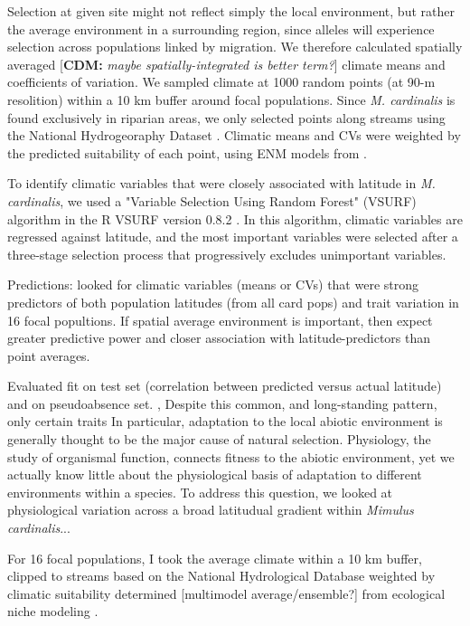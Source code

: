 \documentclass[11pt, oneside]{article}\usepackage[]{graphicx}\usepackage[]{color}
\newcommand{\pkg}[1]{{\fontseries{b}\selectfont #1}}
\newcommand{\cdm}[1]{{ \color{magenta} [{\bf{CDM:}} {\em#1}]}} %
\begin{document}
Selection at given site might not reflect simply the local environment, but rather the average environment in a surrounding region, since alleles will experience selection across populations linked by migration. We therefore calculated spatially averaged \cdm{maybe spatially-integrated is better term?} climate means and coefficients of variation. We sampled climate at 1000 random points (at 90-m resolition) within a 10 km buffer around focal populations. Since \textit{M. cardinalis} is found exclusively in riparian areas, we only selected points along streams using the National Hydrogeoraphy Dataset \citep{NHD}. Climatic means and CVs were weighted by the predicted suitability of each point, using ENM models from \cite{Angert_ENM}.

To identify climatic variables that were closely associated with latitude in \textit{M. cardinalis}, we used a "Variable Selection Using Random Forest" (VSURF) algorithm in the R \pkg{VSURF} version 0.8.2 \citep{Genuer_etal_2014}. In this algorithm, climatic variables are regressed against latitude, and the most important variables were selected after a three-stage selection process that progressively excludes unimportant variables.

Predictions: looked for climatic variables (means or CVs) that were strong predictors of both population latitudes (from all card pops) and trait variation in 16 focal popultions. If spatial average environment is important, then expect greater predictive power and closer association with latitude-predictors than point averages.

Evaluated fit on test set (correlation between predicted versus actual latitude) and on pseudoabsence set.
, Despite this common, and long-standing pattern, only certain traits In particular, adaptation to the local abiotic environment is generally thought to be the major cause of natural selection. Physiology, the study of organismal function, connects fitness to the abiotic environment, yet we actually know little about the physiological basis of adaptation to different environments within a species. To address this question, we looked at physiological variation across a broad latitudual gradient within \textit{Mimulus cardinalis}...

For 16 focal populations, I took the average climate within a 10 km buffer, clipped to streams based on the National Hydrological Database \citep{NHD} weighted by climatic suitability determined [multimodel average/ensemble?] from ecological niche modeling \citep{Angert_ENM}.
\end{document}
